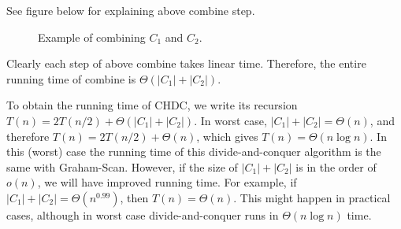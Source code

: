 See figure below for explaining above combine step.

\begin{figure}[h!]
\centering{}
\caption{Example of combining $C_1$ and $C_2$.}
\label{fig:meta-graph}
\end{figure}



Clearly each step of above combine takes linear time. Therefore, the entire running time of combine is $\Theta(|C_1| + |C_2|)$.

To obtain the running time of CHDC, we write its recursion $T(n) = 2T(n/2) + \Theta(|C_1| + |C_2|)$.
In worst case, $|C_1| + |C_2| = \Theta(n)$, and therefore $T(n) = 2T(n/2) + \Theta(n)$, which gives $T(n) = \Theta(n\log n)$.
In this (worst) case the running time of this divide-and-conquer algorithm is the same with Graham-Scan.
However, if the size of $|C_1| + |C_2|$ is in the order of $o(n)$, we will have
improved running time.  For example, if $|C_1| + |C_2| = \Theta(n^{0.99})$, then $T(n) = \Theta(n)$.  
This might happen in practical cases, although in worst case divide-and-conquer runs in $\Theta(n\log n)$ time.



